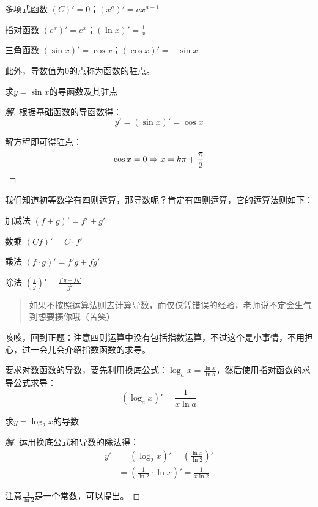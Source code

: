 \begin{desclist}
	\item[多项式函数] $(C)'=0$；$(x^a)'=ax^{a-1}$
	\item[指对函数] $(e^x)'=e^x$；$(\ln x)'=\frac{1}{x}$
	\item[三角函数] $(\sin x)'=\cos x$；$(\cos x)'=-\sin x$
\end{desclist}

此外，导数值为$0$的点称为函数的驻点。

\begin{example}
	求$y=\sin x$的导函数及其驻点
\end{example}
\begin{proof}[解]
	根据基础函数的导函数得：\[y'=(\sin x)'=\cos x\]

	解方程即可得驻点：\[\cos x=0\Rightarrow x=k\pi+\frac{\pi}{2}\qedhere\]
\end{proof}

我们知道初等数学有四则运算，那导数呢？肯定有四则运算，它的运算法则如下：

\begin{desclist}
	\item[加减法] $(f\pm g)'=f'\pm g'$
	\item[数乘] $(Cf)'=C\cdot f'$
	\item[乘法] $(f\cdot g)'=f'g+fg'$
	\item[除法] $(\frac{f}{g})'=\frac{f'g-fg'}{g^2}$
\end{desclist}

\begin{quote}
	如果不按照运算法则去计算导数，而仅仅凭错误的经验，老师说不定会生气到想要揍你哦（苦笑）
\end{quote}

咳咳，回到正题：注意四则运算中没有包括指数运算，不过这个是小事情，不用担心，过一会儿会介绍指数函数的求导。

\noindent\dotfill

要求对数函数的导数，要先利用换底公式：$\log_ax=\frac{\ln x}{\ln a}$，然后使用指对函数的求导公式求导：
\[(\log_ax)'=\frac{1}{x\ln a}\]

\begin{example}
	求$y=\log_2x$的导数
\end{example}
\begin{proof}[解]
	运用换底公式和导数的除法得：
	\[\begin{aligned}
		y'&=(\log_2x)'=(\frac{\ln x}{\ln2})' \\
		  &=(\frac{1}{\ln2}\cdot\ln x)'=\frac{1}{x\ln2}
	\end{aligned}\]

	注意$\frac{1}{\ln2}$是一个常数，可以提出。
\end{proof}

